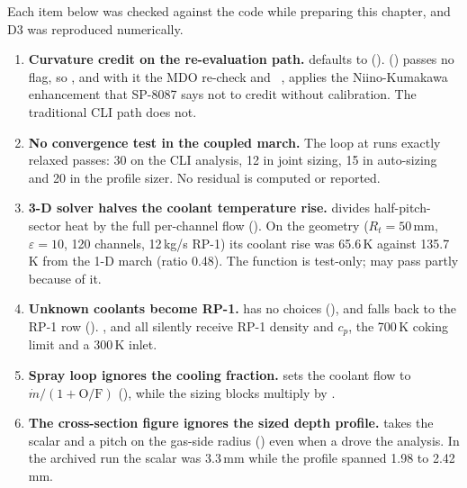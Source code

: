 Each item below was checked against the code while preparing this chapter, and D3 was reproduced numerically.

\begin{enumerate}[label=D\arabic*.]
\item \textbf{Curvature credit on the re-evaluation path.}  defaults to  ().  () passes no flag, so , and with it the MDO  re-check and ~, applies the Niino-Kumakawa enhancement that SP-8087 says not to credit without calibration. The traditional CLI path does not.
\item \textbf{No convergence test in the coupled march.} The loop at  runs exactly  relaxed passes: 30 on the CLI analysis, 12 in joint sizing, 15 in auto-sizing and 20 in the profile sizer. No residual is computed or reported.
\item \textbf{3-D solver halves the coolant temperature rise.}  divides half-pitch-sector heat by the full per-channel flow (). On the  geometry ($R_t = 50$\,mm, $\varepsilon = 10$, 120 channels, 12\,kg/s RP-1) its coolant rise was 65.6\,K against 135.7\,K from the 1-D march (ratio 0.48). The function is test-only;  may pass partly because of it.
\item \textbf{Unknown coolants become RP-1.}  has no choices (), and  falls back to the RP-1 row (). ,  and  all silently receive RP-1 density and $c_p$, the 700\,K coking limit and a 300\,K inlet.
\item \textbf{Spray loop ignores the cooling fraction.}  sets the coolant flow to $\dot m/(1+\mathrm{O/F})$ (), while the sizing blocks multiply by .
\item \textbf{The cross-section figure ignores the sized depth profile.}  takes the scalar  and a pitch on the gas-side radius () even when a  drove the analysis. In the archived run the scalar was 3.3\,mm while the profile spanned 1.98 to 2.42\,mm.

\end{enumerate}
